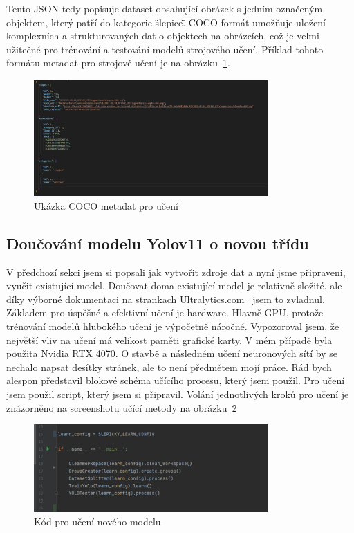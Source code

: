 Tento JSON tedy popisuje dataset obsahující obrázek s jedním označeným objektem, který patří do kategorie \"slepice\".
COCO formát umožňuje uložení komplexních a strukturovaných dat o objektech na obrázcích, což je velmi užitečné pro trénování a testování modelů strojového učení.
Příklad tohoto formátu metadat pro strojové učení je na obrázku~\ref{fig:coco_format}.

\begin{figure}[htbp]
    \centering
    \includegraphics[width=0.8\textwidth]{img/coco_format}
    \caption{Ukázka COCO metadat pro učení}
    \label{fig:coco_format}
\end{figure}

\subsection*{Doučování modelu Yolov11 o novou třídu}\label{subsec:doucovani-modelu-yolov11-o-novou-tridu}
V předchozí sekci jsem si popsali jak vytvořit zdroje dat a nyní jsme připraveni, vyučit existující model.
Doučovat doma existující model je relativně složité, ale díky výborné dokumentaci na strankach Ultralytics.com~\cite{ultralytics} jsem to zvladnul.
Základem pro úspěšné a efektivní učení je hardware.
Hlavně GPU, protože trénování modelů hlubokého učení je výpočetně náročné.
Vypozoroval jsem, že největší vliv na učení má velikost paměti grafické karty.
V mém případě byla použita Nvidia RTX 4070.
O stavbě a následném učení neuronových sítí by se nechalo napsat desítky stránek, ale to není předmětem mojí práce.
Rád bych alespon představil blokové schéma učícího procesu, který jsem použil.\newline
\newline
Pro učení jsem použil script, který jsem si připravil.
Volání jednotlivých kroků pro učení je znázorněno na screenshotu učící metody na obrázku~\ref{fig:learn_script}

\begin{figure}[htbp]
    \centering
    \includegraphics[width=0.8\textwidth]{img/learn_script}
    \caption{Kód pro učení nového modelu}
    \label{fig:learn_script}
\end{figure}

